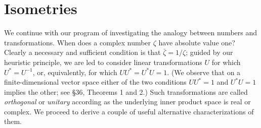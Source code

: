 \section{Isometries}

We continue with our program of investigating the analogy between numbers and
transformations. When does a complex number \(\zeta\) have absolute value one?
Clearly a necessary and sufficient condition is that \(\bar{\zeta} = 1/\zeta\);
guided by our heuristic principle, we are led to consider linear transformations
\(U\) for which \(U^* = U^{-1}\), or, equivalently, for which \(UU^* = U^* U =
1\). (We observe that on a finite-dimensional vector space either of the two
conditions \(UU^* = 1\) and \(U^*U = 1\) implies the other; see §36, Theorems 1
and 2.) Such transformations are called \emph{orthogonal} or \emph{unitary}
according as the underlying inner product space is real or complex. We proceed
to derive a couple of useful alternative characterizations of them.


